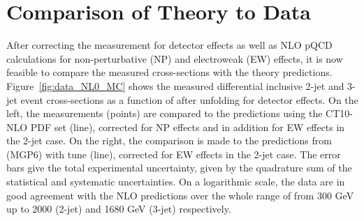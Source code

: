 \section{Comparison of Theory to Data}
After correcting the measurement for detector effects as well as NLO pQCD calculations for non-perturbative (NP) and electroweak (EW) effects, it is now feasible to compare the measured cross-sections with the theory predictions. Figure~\ref{fig:data_NL0_MC} shows the measured differential inclusive 2-jet and 3-jet event cross-sections as a function of \httwo after unfolding for detector effects. On the left, the measurements (points) are compared to the \NLOJETPP predictions using the CT10-NLO PDF set (line), corrected for NP effects and in addition for EW effects in the 2-jet case. On the right, the comparison is made to the predictions from \MadGraphFn \plusn \PYTHIAS (MG\plusn P6) with tune \Ztwostar (line), corrected for EW effects in the 2-jet case. The error bars give the total experimental uncertainty, given by the quadrature sum of the statistical and systematic uncertainties. On a logarithmic scale, the data are in good agreement with the NLO predictions over the whole range of \httwo from 300 GeV up to 2000 (2-jet) and 1680 GeV (3-jet) respectively. 


